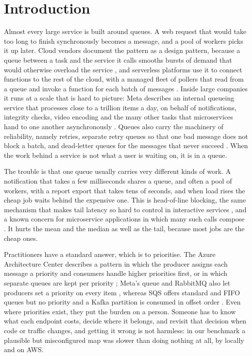 \section{Introduction}\label{sec:intro}

Almost every large service is built around queues. A web request that would take too long to finish synchronously becomes a message, and a pool of workers picks it up
later. Cloud vendors document the pattern as a design pattern, because a queue between a task and the service it calls smooths bursts of demand that would otherwise
overload the service \citep{azureleveling}, and serverless platforms use it to connect functions to the rest of the cloud, with a managed fleet of pollers that read from a queue and invoke a
function for each batch of messages \citep{lambdasqs}. Inside large companies it runs at a scale that is hard to picture: Meta describes an internal queueing service that processes close to a trillion items a day, on behalf of
notifications, integrity checks, video encoding and the many other tasks that microservices hand to one another asynchronously \citep{foqs2021}. Queues also carry the machinery of reliability, namely retries,
separate retry queues so that one bad message does not block a batch, and dead-letter queues for the messages that never succeed \citep{uberdlq}. When the work behind a service is not what a user is waiting on, it is in a queue.

The trouble is that one queue usually carries very different kinds of work. A notification that takes a few milliseconds shares a queue, and often a pool of workers, with a report export that takes tens of seconds, and when load rises the cheap
job waits behind the expensive one. This is head-of-line blocking, the same mechanism that makes tail latency so hard to control in interactive services \citep{dean2013tail}, and a known concern for microservice applications in which
many such calls compose \citep{gan2019deathstar}. It hurts the mean and the median as well as the tail, because most jobs are the cheap ones.

Practitioners have a standard answer, which is to prioritise. The Azure Architecture Center describes a pattern in which the producer assigns each message a priority and consumers handle higher priorities first, or in which separate queues are kept per priority
\citep{azurepriority}; Meta's queue and RabbitMQ also let producers set a priority on every item \citep{foqs2021,rabbitmqpriority}, whereas SQS offers standard and FIFO queues but no priority \citep{sqstypes} and a Kafka partition is consumed in offset order \citep{kreps2011kafka}. Even where priorities exist, they put the
burden on a person. Someone has to know what each endpoint costs, decide where it belongs, and revisit that decision when code or traffic changes, and getting it wrong is not harmless: in our benchmark a plausible but misconfigured map was slower than doing nothing at all, by \VTwoMisconfVsFifoAbs{} locally and \EOneMisconfVsFifoAbs{} on AWS.

